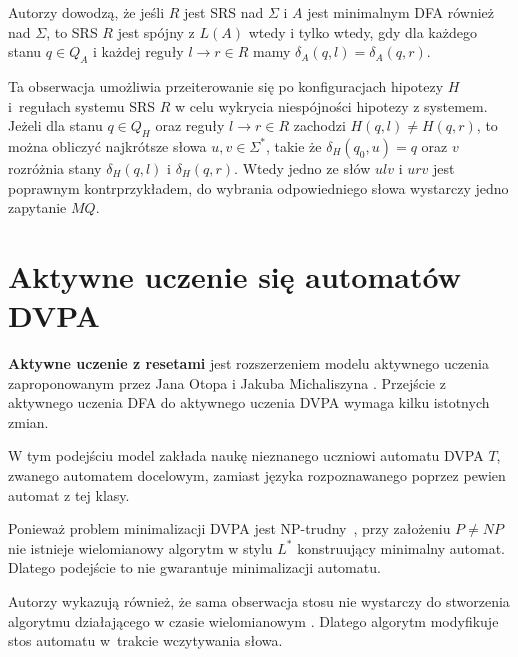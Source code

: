 Autorzy dowodzą, że jeśli $R$ jest SRS nad $\Sigma$ i $A$ jest minimalnym DFA również nad $\Sigma$,
to SRS $R$ jest spójny z $L(A)$ wtedy i tylko wtedy, gdy dla każdego stanu $q \in Q_A$ i każdej reguły
$l \to r \in R$ mamy $\delta_A(q, l) = \delta_A(q, r)$.

Ta obserwacja umożliwia przeiterowanie się po konfiguracjach hipotezy $H$ i~regułach systemu SRS $R$ w celu wykrycia
niespójności hipotezy z systemem. Jeżeli dla stanu $q \in Q_H$ oraz reguły $l \to r \in R$ zachodzi
$H(q,l) \neq H(q,r)$, to można obliczyć najkrótsze słowa $u, v \in \Sigma^*$, takie że $\delta_H(q_0, u) = q$ oraz $v$
rozróżnia stany $\delta_H(q, l)$ i $\delta_H(q, r)$. Wtedy jedno ze słów $ulv$ i $urv$ jest poprawnym kontrprzykładem,
do wybrania odpowiedniego słowa wystarczy jedno zapytanie $MQ$.

\section{Aktywne uczenie się automatów DVPA}

\textbf{Aktywne uczenie z resetami} jest rozszerzeniem modelu aktywnego uczenia zaproponowanym przez
Jana Otopa i Jakuba Michaliszyna \cite[5. Learning with resets, 6. Learning with a single reset]{main}.
Przejście z aktywnego uczenia DFA do aktywnego uczenia DVPA wymaga kilku istotnych zmian.

W tym podejściu model zakłada naukę nieznanego uczniowi automatu DVPA $T$, zwanego automatem docelowym,
zamiast języka rozpoznawanego poprzez pewien automat z tej klasy.

Ponieważ problem minimalizacji DVPA jest NP-trudny~\cite{minimization}, przy założeniu $P \neq NP$
nie istnieje wielomianowy algorytm w stylu $L^*$ konstruujący minimalny automat.
Dlatego podejście to nie gwarantuje minimalizacji automatu.

Autorzy wykazują również, że sama obserwacja stosu nie wystarczy do stworzenia algorytmu działającego
w czasie wielomianowym \cite[3.1 Difficulty of adapting $L^*$ to visibly pushdown languages]{main}.
Dlatego algorytm modyfikuje stos automatu w~trakcie wczytywania słowa.

